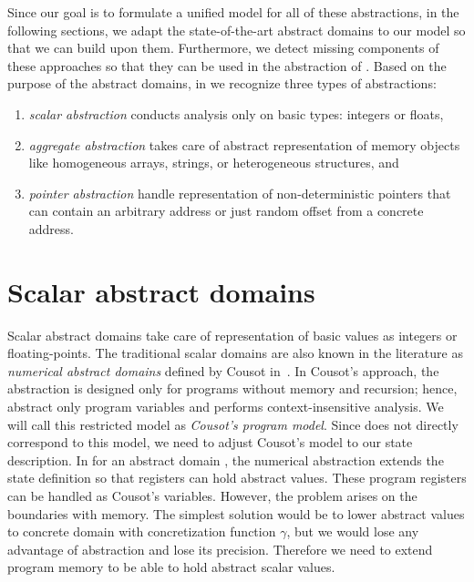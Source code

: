 Since our goal is to formulate a unified model for all of these abstractions,
in the following sections, we adapt the state-of-the-art abstract
domains to our \llvm model so that we can build upon them. Furthermore, we
detect missing components of these approaches so that they can be used in the
abstraction of \llvm. Based on the purpose of the abstract domains, in \llvm we
recognize three types of abstractions:
\begin{enumerate}
    \item \emph{scalar abstraction} conducts analysis only on basic types:
        integers or floats,
    \item \emph{aggregate abstraction} takes care of abstract representation of
        memory objects like homogeneous arrays, strings, or heterogeneous
        structures, and
    \item \emph{pointer abstraction} handle representation of non-deterministic
        pointers that can contain an arbitrary address or just random offset
        from a concrete address.
\end{enumerate}

\section{Scalar abstract domains}
\label{sec:domains}

Scalar abstract domains take care of representation of basic \llvm values as
integers or floating-points. The traditional scalar domains are also known in
the literature as \emph{numerical abstract domains} defined by Cousot
in~\cite{Cousot1977}. In Cousot's approach, the abstraction is designed only
for programs without memory and recursion; hence, abstract only program
variables and performs context-insensitive analysis. We will call this
restricted model as \emph{Cousot's program model}. Since \llvm does not
directly correspond to this model, we need to adjust Cousot's model to our
state description. In \llvm for an abstract domain \domain{}, the numerical
abstraction extends the state definition so that registers can hold abstract
values. These program registers can be handled as Cousot's variables. However,
the problem arises on the boundaries with memory.  The simplest solution would
be to lower abstract values to concrete domain with concretization function
$\gamma$, but we would lose any advantage of abstraction and lose its
precision.  Therefore we need to extend \llvm program memory to be able to hold
abstract scalar values.

